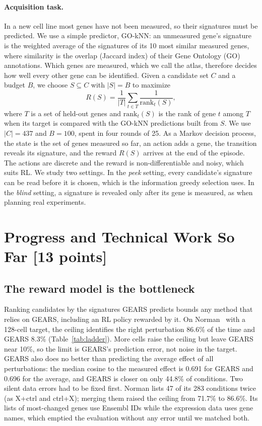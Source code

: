 \documentclass[11pt, letterpaper]{cmu}
\begin{document}
\paragraph{Acquisition task.} In a new cell line most genes have not been measured, so their
signatures must be predicted. We use a simple predictor, GO-kNN: an unmeasured gene's signature
is the weighted average of the signatures of its 10 most similar measured genes, where
similarity is the overlap (Jaccard index) of their Gene Ontology (GO) annotations. Which genes
are measured, which we call the atlas, therefore decides how well every other gene can be
identified. Given a candidate
set $C$ and a budget $B$, we choose $S\subseteq C$ with $|S|=B$ to maximize
\[
R(S)=\frac{1}{|T|}\sum_{t\in T}\frac{1}{\mathrm{rank}_t(S)},
\]
where $T$ is a set of held-out genes and $\mathrm{rank}_t(S)$ is the rank of gene $t$ among $T$
when its target is compared with the GO-kNN predictions built from $S$. We use $|C|=437$ and
$B=100$, spent in four rounds of 25. As a Markov decision process, the state is the set of genes
measured so far, an action adds a gene, the transition reveals its signature, and the reward
$R(S)$ arrives at the end of the episode. The actions are discrete and the reward is
non-differentiable and noisy, which suits RL. We study two settings. In the \emph{peek} setting,
every candidate's signature can be read before it is chosen, which is the information greedy
selection uses. In the \emph{blind} setting, a signature is revealed only after its gene is
measured, as when planning real experiments.

\section{Progress and Technical Work So Far [13 points]}

\subsection{The reward model is the bottleneck}
\label{sec:oracle}

Ranking candidates by the signatures GEARS predicts bounds any method that relies on GEARS,
including an RL policy rewarded by it. On
Norman~\citep{norman2019gi} with a 128-cell target, the ceiling identifies the right perturbation
86.6\% of the time and GEARS 8.3\% (Table~\ref{tab:ladder}). More cells raise the ceiling but
leave GEARS near 10\%, so the limit is GEARS's prediction error, not noise in the target. GEARS
also does no better than predicting the average effect of all perturbations: the median cosine
to the measured effect is 0.691 for GEARS and 0.696 for the average, and GEARS is closer on only
44.8\% of conditions. Two silent data errors had to be fixed first. Norman lists 47 of its 283
conditions twice (as X+ctrl and ctrl+X); merging them raised the ceiling from 71.7\% to 86.6\%.
Its lists of most-changed genes use Ensembl IDs while the expression data uses gene names, which
emptied the evaluation without any error until we matched both.
\end{document}
